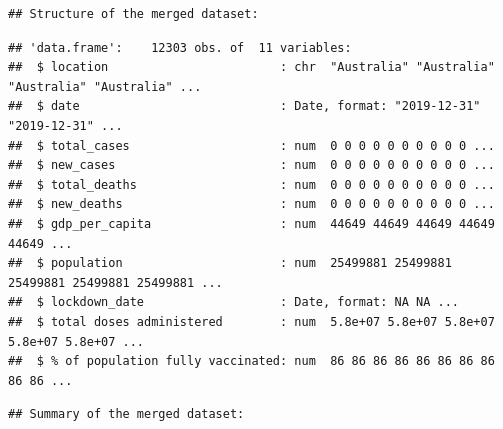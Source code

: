 \documentclass[
]{article}
\begin{document}
\begin{verbatim}
## Structure of the merged dataset:
\end{verbatim}

\begin{verbatim}
## 'data.frame':    12303 obs. of  11 variables:
##  $ location                        : chr  "Australia" "Australia" "Australia" "Australia" ...
##  $ date                            : Date, format: "2019-12-31" "2019-12-31" ...
##  $ total_cases                     : num  0 0 0 0 0 0 0 0 0 0 ...
##  $ new_cases                       : num  0 0 0 0 0 0 0 0 0 0 ...
##  $ total_deaths                    : num  0 0 0 0 0 0 0 0 0 0 ...
##  $ new_deaths                      : num  0 0 0 0 0 0 0 0 0 0 ...
##  $ gdp_per_capita                  : num  44649 44649 44649 44649 44649 ...
##  $ population                      : num  25499881 25499881 25499881 25499881 25499881 ...
##  $ lockdown_date                   : Date, format: NA NA ...
##  $ total doses administered        : num  5.8e+07 5.8e+07 5.8e+07 5.8e+07 5.8e+07 ...
##  $ % of population fully vaccinated: num  86 86 86 86 86 86 86 86 86 86 ...
\end{verbatim}

\begin{verbatim}
## Summary of the merged dataset:
\end{verbatim}
\end{document}
